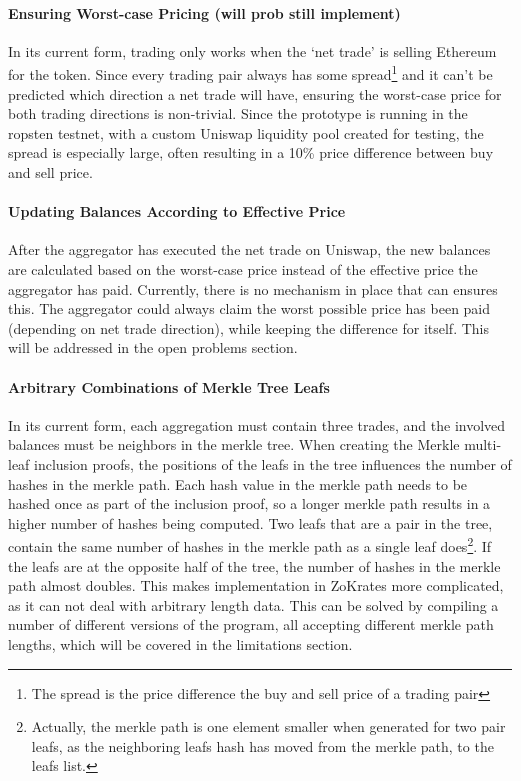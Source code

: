 \documentclass[../../thesis.tex]{subfiles}
\begin{document}
\paragraph{Ensuring Worst-case Pricing (will prob still implement)}
In its current form, trading only works when the `net trade' is selling Ethereum for the token. Since every trading pair always has some spread\footnote{The spread is the price difference the buy and sell price of a trading pair} and it can't be predicted which direction a net trade will have, ensuring the worst-case price for both trading directions is non-trivial. Since the prototype is running in the ropsten testnet, with a custom Uniswap liquidity pool created for testing, the spread is especially large, often resulting in a 10\% price difference between buy and sell price. 

\paragraph{Updating Balances According to Effective Price}
After the aggregator has executed the net trade on Uniswap, the new balances are calculated based on the worst-case price instead of the effective price the aggregator has paid. Currently, there is no mechanism in place that can ensures this. The aggregator could always claim the worst possible price has been paid (depending on net trade direction), while keeping the difference for itself. This will be addressed in the open problems section.

\paragraph{Arbitrary Combinations of Merkle Tree Leafs}
In its current form, each aggregation must contain three trades, and the involved balances must be neighbors in the merkle tree. When creating the Merkle multi-leaf inclusion proofs, the positions of the leafs in the tree influences the number of hashes in the merkle path. Each hash value in the merkle path needs to be hashed once as part of the inclusion proof, so a longer merkle path results in a higher number of hashes being computed. Two leafs that are a pair in the tree, contain the same number of hashes in the merkle path as a single leaf does\footnote{Actually, the merkle path is one element smaller when generated for two pair leafs, as the neighboring leafs hash has moved from the merkle path, to the leafs list.}. If the leafs are at the opposite half of the tree, the number of hashes in the merkle path almost doubles. This makes implementation in ZoKrates more complicated, as it can not deal with arbitrary length data. This can be solved by compiling a number of different versions of the program, all accepting different merkle path lengths, which will be covered in the limitations section.
\end{document}
